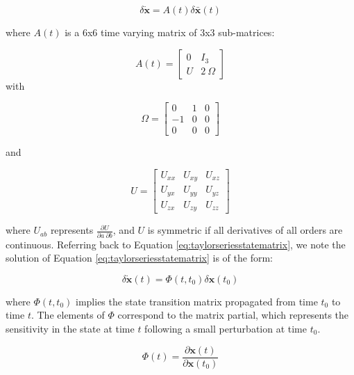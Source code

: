  \begin{equation}\label{eq:taylorseriesstatematrix}
 \delta \pmb{\dot{x}} = A\left(t\right) \delta \pmb{\bar x} \left(t\right)
 \end{equation}

where $A\left(t\right)$ is a 6x6 time varying matrix of 3x3 sub-matrices:

\begin{equation}\label{eq:jacobianequation}
A\left(t\right) = 
\begin{bmatrix}
0 & I_3 \\
U & 2~\Omega
\end{bmatrix}
\end{equation}
with

\begin{equation}
\Omega = 
\begin{bmatrix}
0 & 1 & 0 \\
-1 & 0 & 0 \\
0 & 0 & 0
\end{bmatrix}
\end{equation}

and

\begin{equation}
U = 
\begin{bmatrix}
U_{xx} & U_{xy} & U_{xz} \\
U_{yx} & U_{yy} & U_{yz} \\
U_{zx} & U_{zy} & U_{zz}
\end{bmatrix}
\end{equation}

where $U_{ab}$ represents $\frac{\partial U}{\partial a~\partial b}$, and $U$ is symmetric if all derivatives of all orders are continuous. Referring back to Equation \ref{eq:taylorseriesstatematrix}, we note the solution of Equation \ref{eq:taylorseriesstatematrix} is of the form:

\begin{equation}
\delta \pmb{\dot{x}} \left( t \right) = \Phi \left(t, t_0 \right) \delta \pmb{x} \left(t_0\right)
\end{equation}

where $\Phi \left(t, t_0 \right)$ implies the state transition matrix propagated from time $t_0$ to time $t$. The elements of $\Phi$ correspond to the matrix partial, which represents the sensitivity in the state at time $t$ following a small perturbation at time $t_0$.

\begin{equation}\label{eq:statematrixpartial}
\Phi \left( t \right) = \frac{\partial \pmb{x} \left( t \right)}{\partial \pmb{x} \left( t_0 \right)}
\end{equation}


